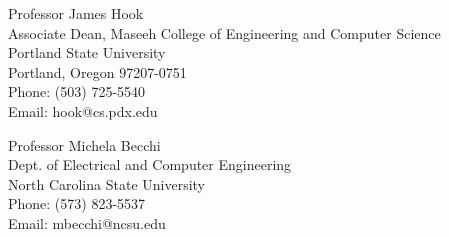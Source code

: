 \documentclass[11pt]{article}
\begin{document}
\vspace{3ex}


\begin{minipage}[t]{3.1in}
\begin{flushleft}
Professor James Hook\\
Associate Dean,
Maseeh College of Engineering and Computer Science\\
Portland State University \\
Portland, Oregon 97207-0751\\
Phone: (503) 725-5540 \\
Email: hook@cs.pdx.edu
\end{flushleft}
\end{minipage}
\begin{minipage}[t]{3.1in}
\begin{flushleft}
Professor Michela Becchi\\
Dept. of Electrical and Computer Engineering\\
North Carolina State University\\
Phone: (573) 823-5537\\
Email: mbecchi@ncsu.edu
\end{flushleft}
\end{minipage}
\end{document}
